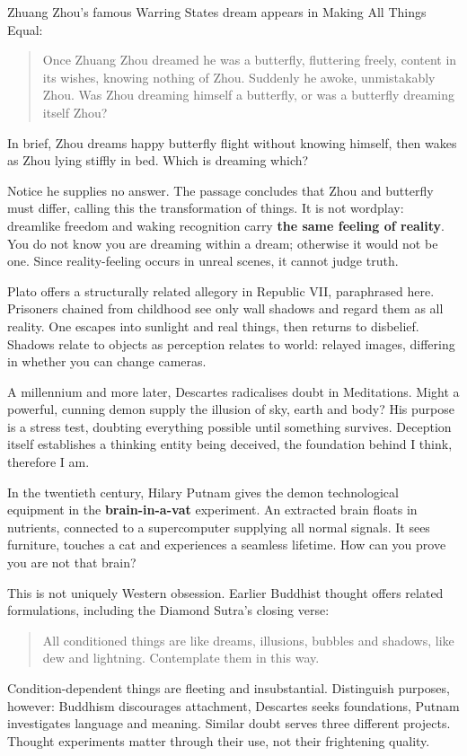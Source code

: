 Zhuang Zhou's famous Warring States dream appears in Making All Things Equal:

\begin{quote}
Once Zhuang Zhou dreamed he was a butterfly, fluttering freely, content in its wishes, knowing nothing of Zhou. Suddenly he awoke, unmistakably Zhou. Was Zhou dreaming himself a butterfly, or was a butterfly dreaming itself Zhou?
\end{quote}
In brief, Zhou dreams happy butterfly flight without knowing himself, then wakes as Zhou lying stiffly in bed. Which is dreaming which?

Notice he supplies no answer. The passage concludes that Zhou and butterfly must differ, calling this the transformation of things. It is not wordplay: dreamlike freedom and waking recognition carry \textbf{the same feeling of reality}. You do not know you are dreaming within a dream; otherwise it would not be one. Since reality-feeling occurs in unreal scenes, it cannot judge truth.

Plato offers a structurally related allegory in Republic VII, paraphrased here. Prisoners chained from childhood see only wall shadows and regard them as all reality. One escapes into sunlight and real things, then returns to disbelief. Shadows relate to objects as perception relates to world: relayed images, differing in whether you can change cameras.

A millennium and more later, Descartes radicalises doubt in Meditations. Might a powerful, cunning demon supply the illusion of sky, earth and body? His purpose is a stress test, doubting everything possible until something survives. Deception itself establishes a thinking entity being deceived, the foundation behind I think, therefore I am.

In the twentieth century, Hilary Putnam gives the demon technological equipment in the \textbf{brain-in-a-vat} experiment. An extracted brain floats in nutrients, connected to a supercomputer supplying all normal signals. It sees furniture, touches a cat and experiences a seamless lifetime. How can you prove you are not that brain?

This is not uniquely Western obsession. Earlier Buddhist thought offers related formulations, including the Diamond Sutra's closing verse:

\begin{quote}
All conditioned things are like dreams, illusions, bubbles and shadows, like dew and lightning. Contemplate them in this way.
\end{quote}
Condition-dependent things are fleeting and insubstantial. Distinguish purposes, however: Buddhism discourages attachment, Descartes seeks foundations, Putnam investigates language and meaning. Similar doubt serves three different projects. Thought experiments matter through their use, not their frightening quality.

